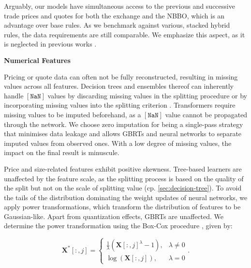 Arguably, our models have simultaneous access to the previous and successive trade prices and quotes for both the exchange and the \gls{NBBO}, which is an advantage over base rules. As we benchmark against various, stacked hybrid rules, the data requirements are still comparable. We emphasize this aspect, as it is neglected in previous works \autocites[][485]{blazejewskiLocalNonParametricModel2005}[][48]{ronenMachineLearningTrade2022}[][9]{rosenthalModelingTradeDirection2012}.

\textbf{Numerical Features}

Pricing or quote data can often not be fully reconstructed, resulting in missing values across all features. Decision trees and ensembles thereof can inherently handle $\mathtt{[NaN]}$ values by discarding missing values in the splitting procedure \autocite[][150--152]{breimanClassificationRegressionTrees2017} or by incorporating missing values into the splitting criterion \autocite[][951]{twalaGoodMethodsCoping2008}. Transformers require missing values to be imputed beforehand, as a $\mathtt{[NaN]}$ value cannot be propagated through the network. We choose zero imputation for being a single-pass strategy that minimises data leakage and allows \glspl{GBRT} and neural networks to separate imputed values from observed ones. With a low degree of missing values, the impact on the final result is minuscule.

Price and size-related features exhibit positive skewness. Tree-based learners are unaffected by the feature scale, as the splitting process is based on the quality of the split but not on the scale of splitting value (cp. \cref{sec:decision-tree}). To avoid the tails of the distribution dominating the weight updates of neural networks, we apply power transformations, which transform the distribution of features to be Gaussian-like. Apart from quantization effects, \glspl{GBRT} are unaffected. We determine the power transformation using the Box-Cox procedure \autocite[][214]{boxAnalysisTransformations2022}, given by:

\begin{equation}
    \mathbf{X}^{*}\left[:,j\right]= \begin{cases}\frac{1}{\lambda}(\mathbf{X}\left[:,j\right]^\lambda-1), & \lambda \neq 0 \\ \log (\mathbf{X}\left[:,j\right]),& \lambda=0\end{cases}.
    \label{eq:box-cox-test}
\end{equation}

